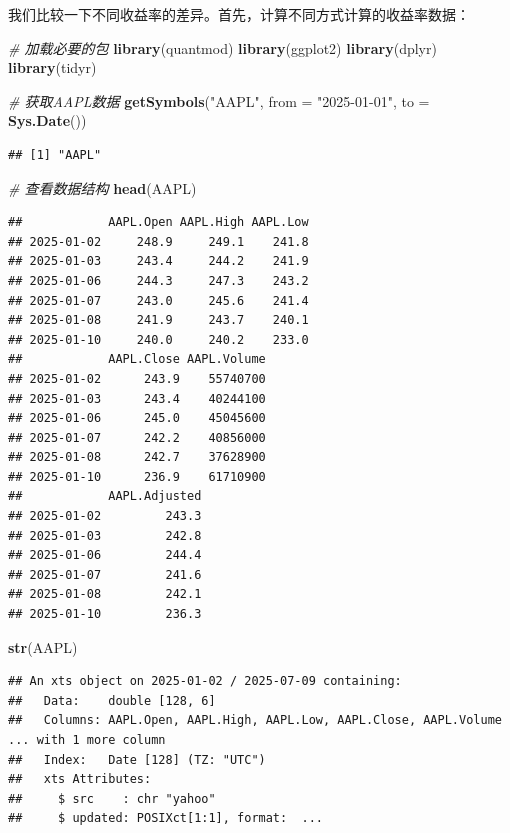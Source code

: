 \documentclass[]{ctexbook}
\newenvironment{Shaded}{\begin{snugshade}}{\end{snugshade}}
\newcommand{\AttributeTok}[1]{\textcolor[rgb]{0.13,0.29,0.53}{#1}}
\newcommand{\CommentTok}[1]{\textcolor[rgb]{0.56,0.35,0.01}{\textit{#1}}}
\newcommand{\FunctionTok}[1]{\textcolor[rgb]{0.13,0.29,0.53}{\textbf{#1}}}
\newcommand{\NormalTok}[1]{#1}
\newcommand{\StringTok}[1]{\textcolor[rgb]{0.31,0.60,0.02}{#1}}
\begin{document}
我们比较一下不同收益率的差异。首先，计算不同方式计算的收益率数据：

\begin{Shaded}
\begin{Highlighting}[]
\CommentTok{\# 加载必要的包}
\FunctionTok{library}\NormalTok{(quantmod)}
\FunctionTok{library}\NormalTok{(ggplot2)}
\FunctionTok{library}\NormalTok{(dplyr)}
\FunctionTok{library}\NormalTok{(tidyr)}

\CommentTok{\# 获取AAPL数据}
\FunctionTok{getSymbols}\NormalTok{(}\StringTok{"AAPL"}\NormalTok{, }\AttributeTok{from =} \StringTok{"2025{-}01{-}01"}\NormalTok{, }\AttributeTok{to =} \FunctionTok{Sys.Date}\NormalTok{())}
\end{Highlighting}
\end{Shaded}

\begin{verbatim}
## [1] "AAPL"
\end{verbatim}

\begin{Shaded}
\begin{Highlighting}[]
\CommentTok{\# 查看数据结构}
\FunctionTok{head}\NormalTok{(AAPL)}
\end{Highlighting}
\end{Shaded}

\begin{verbatim}
##            AAPL.Open AAPL.High AAPL.Low
## 2025-01-02     248.9     249.1    241.8
## 2025-01-03     243.4     244.2    241.9
## 2025-01-06     244.3     247.3    243.2
## 2025-01-07     243.0     245.6    241.4
## 2025-01-08     241.9     243.7    240.1
## 2025-01-10     240.0     240.2    233.0
##            AAPL.Close AAPL.Volume
## 2025-01-02      243.9    55740700
## 2025-01-03      243.4    40244100
## 2025-01-06      245.0    45045600
## 2025-01-07      242.2    40856000
## 2025-01-08      242.7    37628900
## 2025-01-10      236.9    61710900
##            AAPL.Adjusted
## 2025-01-02         243.3
## 2025-01-03         242.8
## 2025-01-06         244.4
## 2025-01-07         241.6
## 2025-01-08         242.1
## 2025-01-10         236.3
\end{verbatim}

\begin{Shaded}
\begin{Highlighting}[]
\FunctionTok{str}\NormalTok{(AAPL)}
\end{Highlighting}
\end{Shaded}

\begin{verbatim}
## An xts object on 2025-01-02 / 2025-07-09 containing: 
##   Data:    double [128, 6]
##   Columns: AAPL.Open, AAPL.High, AAPL.Low, AAPL.Close, AAPL.Volume ... with 1 more column
##   Index:   Date [128] (TZ: "UTC")
##   xts Attributes:
##     $ src    : chr "yahoo"
##     $ updated: POSIXct[1:1], format:  ...
\end{verbatim}
\end{document}
